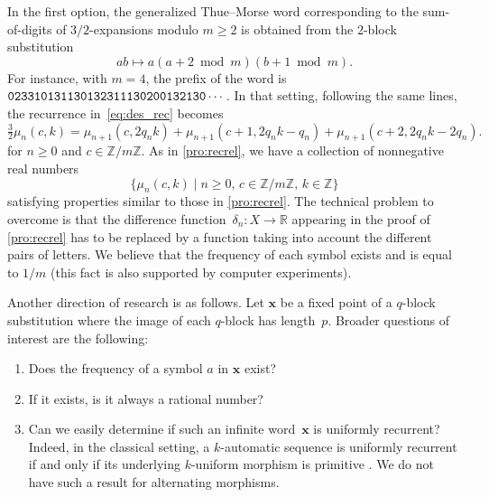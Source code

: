 \documentclass[12pt,reqno]{article}
\newcommand{\Z}{\mathbb{Z}}
\begin{document}
In the first option,  the generalized Thue--Morse word corresponding to the sum-of-digits of $3/2$-expansions modulo $m\ge 2$ is obtained from the $2$-block substitution
\[
  ab \mapsto a(a+2\bmod{m})(b+1\bmod{m}).
\]
For instance, with $m=4$, the prefix of the word is ${\tt 023310131130132311130200132130}\cdots$.
In that setting, following the same lines,  the recurrence in~\eqref{eq:des_rec} becomes
\[
    \tfrac{3}{2} \mu_n(c,k) = 
    \mu_{n+1}(c, 2q_nk) + 
    \mu_{n+1}(c+1, 2q_nk-q_n) +
    \mu_{n+1}(c+2, 2q_nk-2q_n).
  \]
  for $n\ge 0$ and $c\in\mathbb{Z}/m\mathbb{Z}$.
As in \cref{pro:recrel}, we have a collection of nonnegative real numbers
  \[
    \bigl\{\mu_n(c,k) \mid n \ge 0,\, c \in \mathbb{Z}/m\mathbb{Z},\, k \in \Z\bigr\}
  \]
  satisfying properties similar to those in \cref{pro:recrel}. The technical problem to overcome is that the difference function~$\delta_n:X\to\mathbb{R}$ appearing in the proof of \cref{pro:recrel} has to be replaced by a function taking into account the different pairs of letters. We believe that the frequency of each symbol exists and is equal to $1/m$ (this fact is also supported by computer experiments).

Another direction of research is as follows.
  Let $\mathbf{x}$ be a fixed point of a $q$-block substitution where the image of each $q$-block has length~$p$. Broader questions of interest are the following:
  \begin{enumerate}
  \item Does the frequency of a symbol $a$ in $\mathbf{x}$ exist?
  \item If it exists, is it always a rational number?
  \item Can we easily determine if such an infinite word~$\mathbf{x}$ is uniformly recurrent? Indeed, in the classical setting, a $k$-automatic sequence is uniformly recurrent if and only if its underlying $k$-uniform morphism is primitive \cite{Durand}. We do not have such a result for alternating morphisms.
  \end{enumerate}
\end{document}

